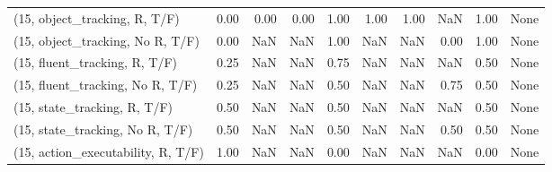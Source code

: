 \begin{table*}[h!]
\begin{adjustbox}{width=2\columnwidth,center}
\begin{tabular}{lrrr|rrr|rrr}
\midrule
(15, object\_tracking, R, T/F)         &                      0.00 &                  0.00 &                      0.00 &                          1.00 &                      1.00 &                          1.00 &                                    NaN &                               1.00 &                                  None \\
(15, object\_tracking, No R, T/F)      &                      0.00 &                   NaN &                       NaN &                          1.00 &                       NaN &                           NaN &                                   0.00 &                               1.00 &                                  None \\
(15, fluent\_tracking, R, T/F)         &                      0.25 &                   NaN &                       NaN &                          0.75 &                       NaN &                           NaN &                                    NaN &                               0.50 &                                  None \\
(15, fluent\_tracking, No R, T/F)      &                      0.25 &                   NaN &                       NaN &                          0.50 &                       NaN &                           NaN &                                   0.75 &                               0.50 &                                  None \\
(15, state\_tracking, R, T/F)          &                      0.50 &                   NaN &                       NaN &                          0.50 &                       NaN &                           NaN &                                    NaN &                               0.50 &                                  None \\
(15, state\_tracking, No R, T/F)       &                      0.50 &                   NaN &                       NaN &                          0.50 &                       NaN &                           NaN &                                   0.50 &                               0.50 &                                  None \\
(15, action\_executability, R, T/F)    &                      1.00 &                   NaN &                       NaN &                          0.00 &                       NaN &                           NaN &                                    NaN &                               0.00 &                                  None \\

\end{tabular}
\end{adjustbox}
\end{table*}
